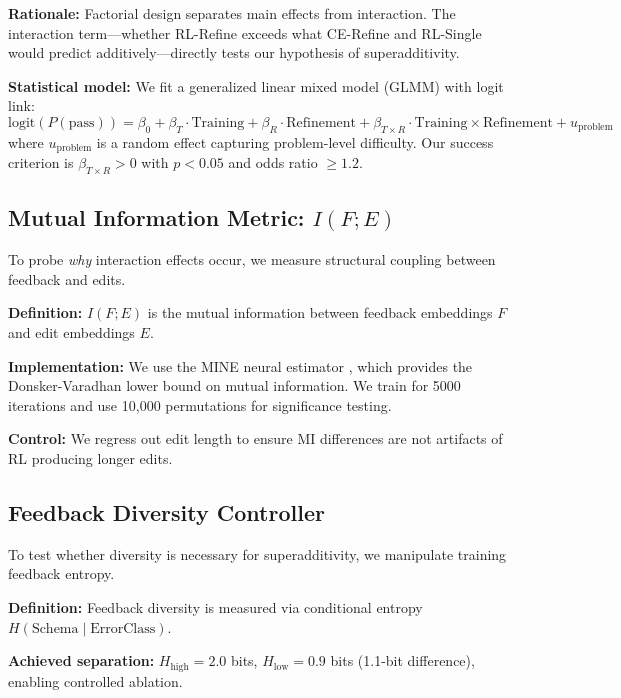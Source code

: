 \textbf{Rationale:} Factorial design separates main effects from interaction. The interaction term---whether RL-Refine exceeds what CE-Refine and RL-Single would predict additively---directly tests our hypothesis of superadditivity.

\textbf{Statistical model:} We fit a generalized linear mixed model (GLMM) with logit link:
\begin{equation}
\text{logit}(P(\text{pass})) = \beta_0 + \beta_T \cdot \text{Training} + \beta_R \cdot \text{Refinement} + \beta_{T \times R} \cdot \text{Training} \times \text{Refinement} + u_{\text{problem}}
\end{equation}
where $u_{\text{problem}}$ is a random effect capturing problem-level difficulty. Our success criterion is $\beta_{T \times R} > 0$ with $p < 0.05$ and odds ratio $\geq 1.2$.

\subsection{Mutual Information Metric: $I(F;E)$}

To probe \emph{why} interaction effects occur, we measure structural coupling between feedback and edits.

\textbf{Definition:} $I(F;E)$ is the mutual information between feedback embeddings $F$ and edit embeddings $E$.

\textbf{Implementation:} We use the MINE neural estimator \cite{belghazi2018mine}, which provides the Donsker-Varadhan lower bound on mutual information. We train for 5000 iterations and use 10,000 permutations for significance testing.

\textbf{Control:} We regress out edit length to ensure MI differences are not artifacts of RL producing longer edits.

\subsection{Feedback Diversity Controller}

To test whether diversity is necessary for superadditivity, we manipulate training feedback entropy.

\textbf{Definition:} Feedback diversity is measured via conditional entropy $H(\text{Schema} \mid \text{ErrorClass})$.

\textbf{Achieved separation:} $H_{\text{high}} = 2.0$ bits, $H_{\text{low}} = 0.9$ bits (1.1-bit difference), enabling controlled ablation.
